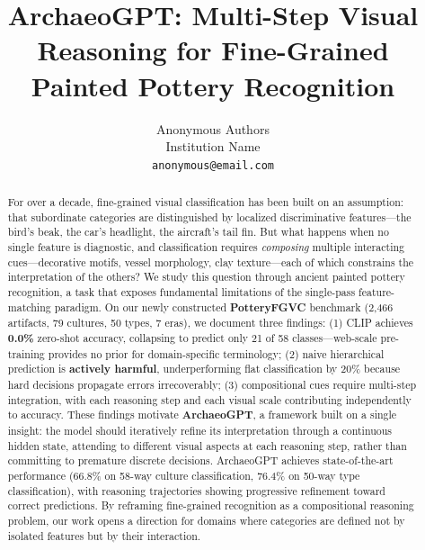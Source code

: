 \documentclass[10pt,twocolumn,letterpaper]{article}
\begin{document}
\title{ArchaeoGPT: Multi-Step Visual Reasoning for Fine-Grained\\Painted Pottery Recognition}

\author{Anonymous Authors\\
Institution Name\\
{\tt\small anonymous@email.com}
}

\maketitle

\begin{abstract}
For over a decade, fine-grained visual classification has been built on an assumption: that subordinate categories are distinguished by localized discriminative features—the bird's beak, the car's headlight, the aircraft's tail fin. But what happens when no single feature is diagnostic, and classification requires \emph{composing} multiple interacting cues—decorative motifs, vessel morphology, clay texture—each of which constrains the interpretation of the others? We study this question through ancient painted pottery recognition, a task that exposes fundamental limitations of the single-pass feature-matching paradigm. On our newly constructed \textbf{PotteryFGVC} benchmark (2,466 artifacts, 79 cultures, 50 types, 7 eras), we document three findings: (1) CLIP achieves \textbf{0.0\%} zero-shot accuracy, collapsing to predict only 21 of 58 classes—web-scale pre-training provides no prior for domain-specific terminology; (2) naive hierarchical prediction is \textbf{actively harmful}, underperforming flat classification by 20\% because hard decisions propagate errors irrecoverably; (3) compositional cues require multi-step integration, with each reasoning step and each visual scale contributing independently to accuracy. These findings motivate \textbf{ArchaeoGPT}, a framework built on a single insight: the model should iteratively refine its interpretation through a continuous hidden state, attending to different visual aspects at each reasoning step, rather than committing to premature discrete decisions. ArchaeoGPT achieves state-of-the-art performance (66.8\% on 58-way culture classification, 76.4\% on 50-way type classification), with reasoning trajectories showing progressive refinement toward correct predictions. By reframing fine-grained recognition as a compositional reasoning problem, our work opens a direction for domains where categories are defined not by isolated features but by their interaction.

\end{abstract}
\end{document}

